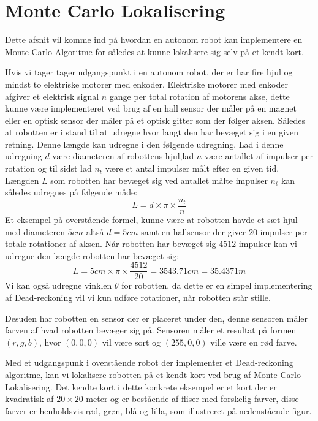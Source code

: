 \documentclass[../../SRP.tex]{subfiles}
\begin{document}
\chapter{Monte Carlo Lokalisering}
Dette afsnit vil komme ind på hvordan en autonom robot kan implementere en Monte Carlo Algoritme for således at kunne lokalisere sig selv på et kendt kort.  

Hvis vi tager tager udgangspunkt i en autonom robot, der er har fire hjul og mindst to elektriske motorer med enkoder. Elektriske motorer med enkoder afgiver et elektrisk signal $n$ gange per total rotation af motorens akse, dette kunne være implementeret ved brug af en hall sensor der måler på en magnet eller en optisk sensor der måler på et optisk gitter som der følger aksen. Således at robotten er i stand til at udregne hvor langt den har bevæget sig i en given retning. Denne længde kan udregne i den følgende udregning. Lad i denne udregning $d$ være diameteren af robottens hjul,lad $n$ være antallet af impulser per rotation og til sidst lad $n_t$ være et antal impulser målt efter en given tid. Længden $L$ som robotten har bevæget sig ved antallet målte impulser $n_t$ kan således udregnes på følgende måde:
\begin{equation}
  L = d \times \pi \times \frac{n_t}{n}
\end{equation}
Et eksempel på overstående formel, kunne være at robotten havde et sæt hjul med diameteren $5cm$ altså $d = 5cm$ samt en hallsensor der giver $20$ impulser per totale rotationer af aksen. Når robotten har bevæget sig $4512$ impulser kan vi udregne den længde robotten har bevæget sig:
\begin{equation}
  L = 5cm \times \pi \times \frac{4512}{20} = 3543.71cm = 35.4371m
\end{equation}
Vi kan også udregne vinklen $\theta$ for robotten, da dette er en simpel implementering af Dead-reckoning vil vi kun udføre rotationer, når robotten står stille.

Desuden har robotten en sensor der er placeret under den, denne sensoren måler farven af hvad robotten bevæger sig på. Sensoren måler et resultat på formen $(r,g,b)$, hvor $(0,0,0)$ vil være sort og $(255,0,0)$ ville være en rød farve. 

Med et udgangspunk i overstående robot der implementer et Dead-reckoning algoritme, kan vi lokalisere robotten på et kendt kort ved brug af Monte Carlo Lokalisering. Det kendte kort i dette konkrete eksempel er et kort der er kvadratisk af $20 \times 20$ meter og er bestående af fliser med forskelig farver, disse farver er henholdsvis rød, grøn, blå og lilla, som illustreret på nedenstående figur.
\end{document}
